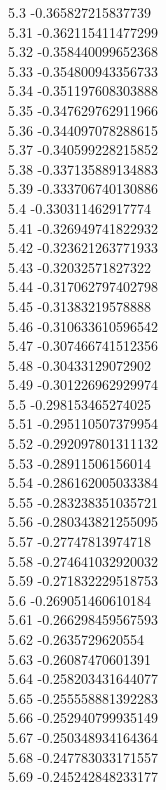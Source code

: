 {5.3	-0.365827215837739\\
5.31	-0.362115411477299\\
5.32	-0.358440099652368\\
5.33	-0.354800943356733\\
5.34	-0.351197608303888\\
5.35	-0.347629762911966\\
5.36	-0.344097078288615\\
5.37	-0.340599228215852\\
5.38	-0.337135889134883\\
5.39	-0.333706740130886\\
5.4	-0.330311462917774\\
5.41	-0.326949741822932\\
5.42	-0.323621263771933\\
5.43	-0.32032571827322\\
5.44	-0.317062797402798\\
5.45	-0.31383219578888\\
5.46	-0.310633610596542\\
5.47	-0.307466741512356\\
5.48	-0.30433129072902\\
5.49	-0.301226962929974\\
5.5	-0.298153465274025\\
5.51	-0.295110507379954\\
5.52	-0.292097801311132\\
5.53	-0.28911506156014\\
5.54	-0.286162005033384\\
5.55	-0.283238351035721\\
5.56	-0.280343821255095\\
5.57	-0.27747813974718\\
5.58	-0.274641032920032\\
5.59	-0.271832229518753\\
5.6	-0.269051460610184\\
5.61	-0.266298459567593\\
5.62	-0.2635729620554\\
5.63	-0.26087470601391\\
5.64	-0.258203431644077\\
5.65	-0.255558881392283\\
5.66	-0.252940799935149\\
5.67	-0.250348934164364\\
5.68	-0.247783033171557\\
5.69	-0.245242848233177\\
}
